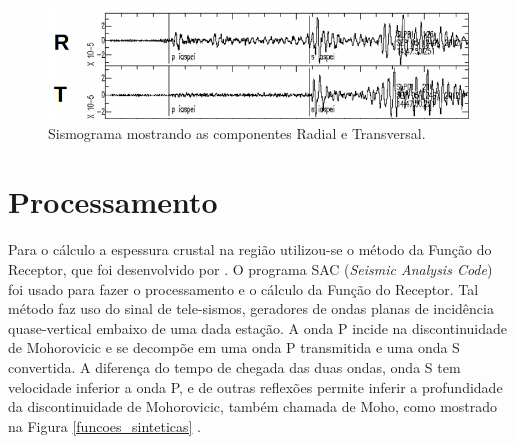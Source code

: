 \begin{figure}[!ht]
\centering
\includegraphics[scale=0.5]{Figs/Componente_Radial_Transversal.png}
\caption{Sismograma mostrando as componentes Radial e Transversal.}
\label{sismo_radial}
\end{figure}

\section{Processamento}

Para o cálculo a espessura crustal na região utilizou-se o método da Função do Receptor, que foi desenvolvido por \cite{Langston_1977}. O programa SAC (\textit{Seismic Analysis Code}) foi usado para fazer o processamento e o cálculo da Função do Receptor. Tal método faz uso do sinal de tele-sismos, geradores de ondas planas de incidência quase-vertical embaixo de uma dada estação. A onda P incide na discontinuidade de Mohorovicic e se decompõe em uma onda P transmitida e uma onda S convertida. A diferença do tempo de chegada das duas ondas, onda S tem velocidade inferior a onda P, e de outras reflexões permite inferir a profundidade da discontinuidade de Mohorovicic, também chamada de Moho, como mostrado na Figura \ref{funcoes_sinteticas} .

